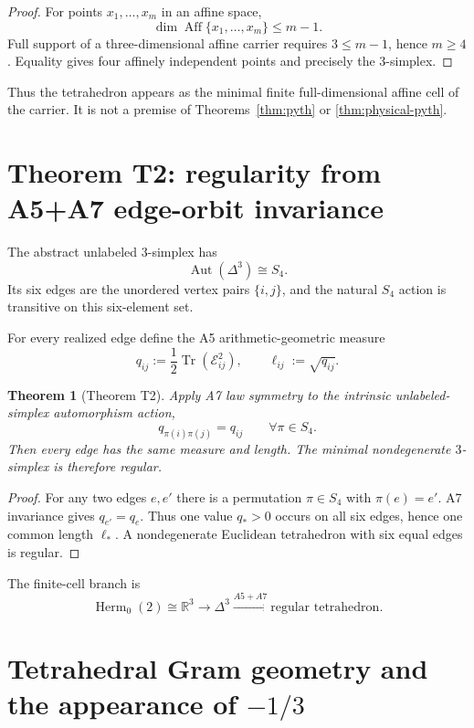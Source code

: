 \documentclass[12pt,a4paper]{article}
\newtheorem{theorem}{Theorem}[section]
\newcommand{\Herm}{\operatorname{Herm}}
\newcommand{\Aff}{\operatorname{Aff}}
\newcommand{\Tr}{\operatorname{Tr}}
\newcommand{\Aut}{\operatorname{Aut}}
\newcommand{\R}{\mathbb{R}}
\newcommand{\Erel}{\mathcal{E}}
\begin{document}
\begin{proof}
For points $x_1,\ldots,x_m$ in an affine space,
\[
\dim\Aff\{x_1,\ldots,x_m\}\le m-1.
\]
Full support of a three-dimensional affine carrier requires $3\le m-1$, hence $m\ge4$. Equality gives four affinely independent points and precisely the $3$-simplex.
\end{proof}

Thus the tetrahedron appears as the minimal finite full-dimensional affine cell of the carrier. It is not a premise of Theorems~\ref{thm:pyth} or \ref{thm:physical-pyth}.

\section{Theorem T2: regularity from A5+A7 edge-orbit invariance}

The abstract unlabeled $3$-simplex has
\[
\boxed{\Aut(\Delta^3)\cong S_4.}
\]
Its six edges are the unordered vertex pairs $\{i,j\}$, and the natural $S_4$ action is transitive on this six-element set.

For every realized edge define the A5 arithmetic-geometric measure
\[
\boxed{
q_{ij}:=\frac12\Tr(\Erel_{ij}^2),
\qquad
\ell_{ij}:=\sqrt{q_{ij}}.
}
\]

\begin{theorem}[Theorem T2]\label{thm:regular}
Apply A7 law symmetry to the intrinsic unlabeled-simplex automorphism action,
\[
q_{\pi(i)\pi(j)}=q_{ij}
\qquad
\forall\pi\in S_4.
\]
Then every edge has the same measure and length. The minimal nondegenerate $3$-simplex is therefore regular.
\end{theorem}

\begin{proof}
For any two edges $e,e'$ there is a permutation $\pi\in S_4$ with $\pi(e)=e'$. A7 invariance gives $q_{e'}=q_e$. Thus one value $q_*>0$ occurs on all six edges, hence one common length $\ell_*$. A nondegenerate Euclidean tetrahedron with six equal edges is regular.
\end{proof}

The finite-cell branch is
\[
\boxed{
\Herm_0(2)\cong\R^3
\longrightarrow
\Delta^3
\xrightarrow{A5+A7}
\text{regular tetrahedron}.
}
\]

\section{Tetrahedral Gram geometry and the appearance of \texorpdfstring{$-1/3$}{-1/3}}
\end{document}
